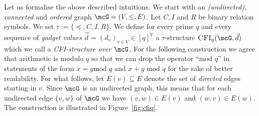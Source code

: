 \documentclass[a4paper,UKenglish]{lipics}
\newcommand{\defeq}{:=}
\newcommand{\inseg}[1]{\ensuremath{[#1]}}
\newcommand{\modulo}{\ensuremath{\text{mod }}}
\newcommand{\logic}[1]{\ensuremath{\textsc{#1}}\xspace}
\theoremstyle{plain}
\begin{document}
\newcommand{\CFI}{\ensuremath{\logic{CFI}_q}}

\smallskip
Let us formalise the above described intuitions.
We start with an \emph{(undirected), connected} 
and \emph{ordered} graph $\mcG = (V,\leq, E)$.
Let $C, I$ and $R$ be binary relation symbols.
We set $\tau \defeq \{ \preceq, C, I, R \}$.
We define for every prime $q$ and every sequence of \emph{gadget values} 
$\vec d = (d_v)_{v \in V} \in \inseg q^V$ a $\tau$-structure $\CFI(\mcG, 
\vec d)$ which we call a \emph{CFI-structure over 
$\mcG$}.
For the following construction we agree that arithmetic is modulo $q$ so that 
we can drop the operator ``$\text{mod } q$'' in 
statements 
of the form $x 
= y \modulo q$ and $x + y \,\,\modulo q$ for the sake of better readability. 
For what follows, let $E(v) \subseteq E$ denote the set of \emph{directed} 
edges starting in $v$. 
Since $\mcG$ is an undirected graph, this means that for each undirected edge 
$\{v,w\}$ of $\mcG$ we have $(v,w) \in E(v)$ and $(w,v) \in E(w)$.
The construction is illustrated in Figure~\ref{fig:cfiq}.
\end{document}
